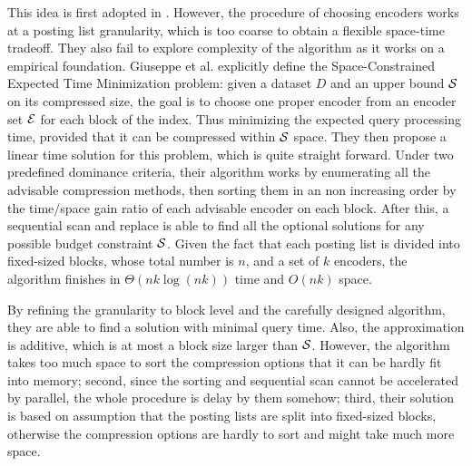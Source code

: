 \documentclass{sig-alternate-05-2015}
\begin{document}
This idea is first adopted in \cite{yan2009inverted}.
However, the procedure of choosing encoders works at a posting list granularity, which is too coarse to obtain a flexible space-time tradeoff.
They also fail to explore complexity of the algorithm as it works on a empirical foundation.
Giuseppe et al. \cite{ottaviano2015optimal} explicitly define the Space-Constrained Expected Time Minimization problem: given a dataset $ D $ and an upper bound $ \cal S $ on its compressed size, the goal is to choose one proper encoder from an encoder set $ \cal E $ for each block of the index.
Thus minimizing the expected query processing time, provided that it can be compressed within $ \cal S $ space.
They then propose a linear time solution for this problem, which is quite straight forward.
Under two predefined dominance criteria, their algorithm works by enumerating all the advisable compression methods, then sorting them in an non increasing order by the time/space gain ratio of each advisable encoder on each block.
After this, a sequential scan and replace is able to find all the optional solutions for any possible budget constraint $ \cal S $.
Given the fact that each posting list is divided into fixed-sized blocks, whose total number is $ n $, and a set of $ k $ encoders, the algorithm finishes in $ \Theta(nk\log(nk)) $ time and $ O(nk) $ space.

By refining the granularity to block level and the carefully designed algorithm, they are able to find a solution with minimal query time.
Also, the approximation is additive, which is at most a block size larger than $ \cal S $.
However, the algorithm takes too much space to sort the compression options that it can be hardly fit into memory; second, since the sorting and sequential scan cannot be accelerated by parallel, the whole procedure is delay by them somehow; third, their solution is based on assumption that the posting lists are split into fixed-sized blocks, otherwise the compression options are hardly to sort and might take much more space. 
\end{document}
